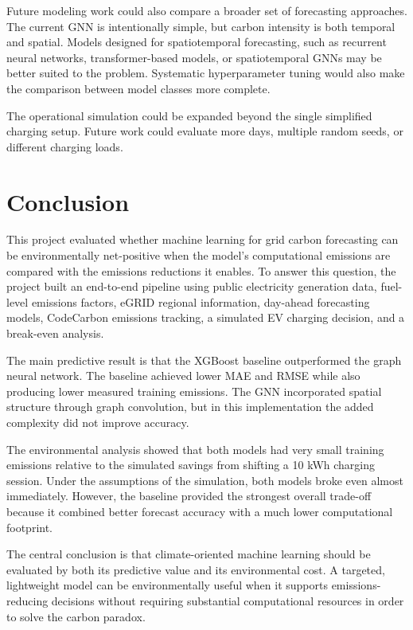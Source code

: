 \documentclass{article}
\begin{document}
Future modeling work could also compare a broader set of forecasting approaches. The current GNN is intentionally simple, but carbon intensity is both temporal and spatial. Models designed for spatiotemporal forecasting, such as recurrent neural networks, transformer-based models, or spatiotemporal GNNs may be better suited to the problem. Systematic hyperparameter tuning would also make the comparison between model classes more complete.

The operational simulation could be expanded beyond the single simplified charging setup. Future work could evaluate more days, multiple random seeds, or different charging loads.

\section{Conclusion}

This project evaluated whether machine learning for grid carbon forecasting can be environmentally net-positive when the model's computational emissions are compared with the emissions reductions it enables. To answer this question, the project built an end-to-end pipeline using public electricity generation data, fuel-level emissions factors, eGRID regional information, day-ahead forecasting models, CodeCarbon emissions tracking, a simulated EV charging decision, and a break-even analysis.

The main predictive result is that the XGBoost baseline outperformed the graph neural network. The baseline achieved lower MAE and RMSE while also producing lower measured training emissions. The GNN incorporated spatial structure through graph convolution, but in this implementation the added complexity did not improve accuracy. 

The environmental analysis showed that both models had very small training emissions relative to the simulated savings from shifting a 10 kWh charging session. Under the assumptions of the simulation, both models broke even almost immediately. However, the baseline provided the strongest overall trade-off because it combined better forecast accuracy with a much lower computational footprint.

The central conclusion is that climate-oriented machine learning should be evaluated by both its predictive value and its environmental cost. A targeted, lightweight model can be environmentally useful when it supports emissions-reducing decisions without requiring substantial computational resources in order to solve the carbon paradox.
\end{document}
